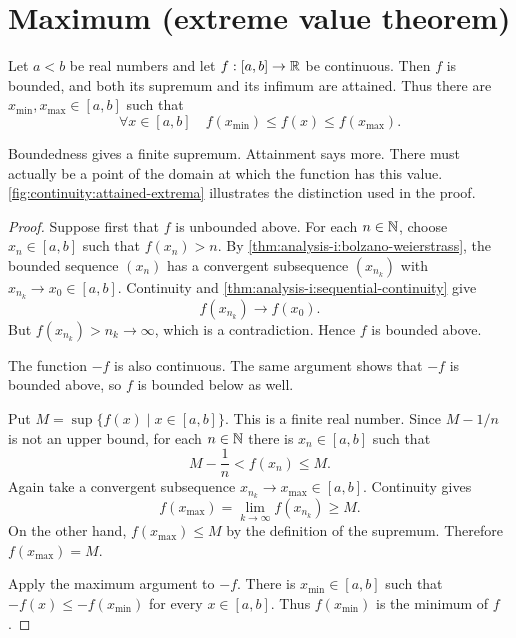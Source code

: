 \section{Maximum (extreme value theorem)}
\label{sec:analysis-i:extreme-value-theorem}

\begin{theorem}
  \label{thm:analysis-i:extreme-value}
  Let $a<b$ be real numbers and let $f:[a,b]\to\mathbb{R}$ be continuous.
  Then $f$ is bounded, and both its supremum and its infimum are attained.
  Thus there are $x_{\min},x_{\max}\in[a,b]$ such that
  \[
    \forall x\in[a,b]\quad
    f(x_{\min})\le f(x)\le f(x_{\max}).
  \]
\end{theorem}


  Boundedness gives a finite supremum. Attainment says more. There must
  actually be a point of the domain at which the function has this value.
  \autoref{fig:continuity:attained-extrema} illustrates the distinction
  used in the proof.

\begin{marginfigure}
  \centering
  
  \caption[Attaining the extreme values.]{Schematic graph
    on a closed interval. The maximum $M$ and minimum $m$ are values of
    the function. The gray points illustrate values approaching $M$.}
  \label{fig:continuity:attained-extrema}
\end{marginfigure}

\begin{proof}
  Suppose first that $f$ is unbounded above. For each $n\in\mathbb{N}$, choose
  $x_n\in[a,b]$ such that $f(x_n)>n$. By
  \autoref{thm:analysis-i:bolzano-weierstrass}, the bounded sequence
  $(x_n)$ has a convergent subsequence $(x_{n_k})$ with
  $x_{n_k}\to x_0\in[a,b]$. Continuity and
  \autoref{thm:analysis-i:sequential-continuity} give
  \[
    f(x_{n_k})\longrightarrow f(x_0).
  \]
  But $f(x_{n_k})>n_k\to\infty$, which is a contradiction. Hence $f$
  is bounded above.


    The function $-f$ is also continuous. The same argument shows that
    $-f$ is bounded above, so $f$ is bounded below as well.


  Put $M=\sup\{f(x)\mid x\in[a,b]\}$. This is a finite real number.
  Since $M-1/n$ is not an upper bound, for each $n\in\mathbb{N}$ there is
  $x_n\in[a,b]$ such that
  \[
    M-\frac1n<f(x_n)\le M.
  \]
  Again take a convergent subsequence $x_{n_k}\to x_{\max}\in[a,b]$.
  Continuity gives
  \[
    f(x_{\max})=\lim_{k\to\infty}f(x_{n_k})\ge M.
  \]
  On the other hand, $f(x_{\max})\le M$ by the definition of the
  supremum. Therefore $f(x_{\max})=M$.


    Apply the maximum argument to $-f$. There is $x_{\min}\in[a,b]$
    such that $-f(x)\le-f(x_{\min})$ for every $x\in[a,b]$. Thus
    $f(x_{\min})$ is the minimum of $f$.

\end{proof}


